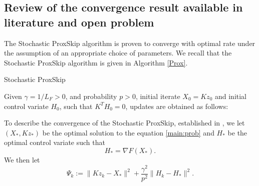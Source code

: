 \subsection{Review of the convergence result available in literature and open problem} 
The Stochastic ProxSkip algorithm \cite{mishchenko2022proxskip} is proven to converge with optimal rate under the assumption of an appropriate choice of parameters. We recall that the Stochastic ProxSkip algorithm is given in Algorithm \ref{Prox}. 
\begin{algorithm}
\caption{Stochastic ProxSkip \cite{mishchenko2022proxskip}}\label{Prox} 
Given $\gamma = 1/L_F > 0$, and probability $p > 0$, initial iterate $X_0 = Kz_0$ and initial control variate $H_0$, such that $K^TH_0 = 0$, updates are obtained as follows:  
\begin{algorithmic}
    \Else{}
    \EndIf
\EndFor
\end{algorithmic}
\end{algorithm}
To describe the convergence of the Stochastic ProxSkip, established in \cite{mishchenko2022proxskip}, we let $(X_*, Kz_*)$ be the optimal solution to the equation \eqref{main:prob} and $H_*$ be the optimal control variate such that 
\begin{equation}
H_* = \nabla F(X_*). 
\end{equation}
We then let 
\begin{equation} 
\Psi_k := \|Kz_k - X_*\|^2 + \frac{\gamma^2}{p^2} \|H_k - H_*\|^2.
\end{equation} 
